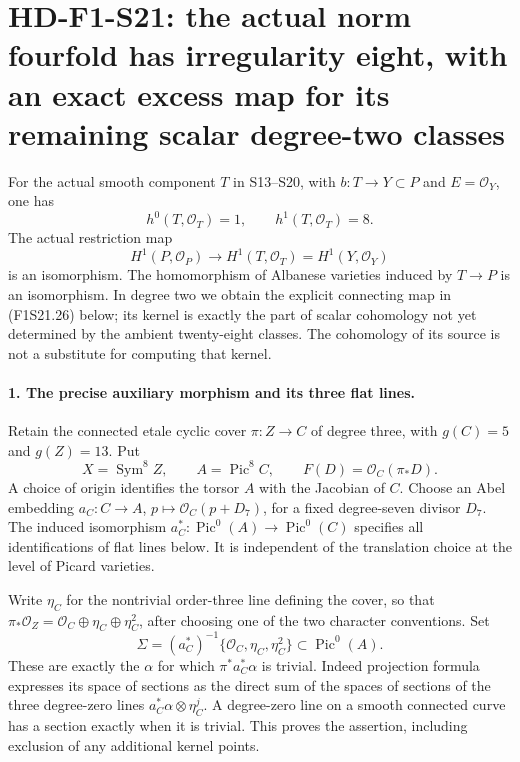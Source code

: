 \section[HD-F1-S21: irregularity eight and the excess boundary map]{HD-F1-S21: the actual norm fourfold has irregularity eight, with an exact excess map for its remaining scalar degree-two classes}
\label{sec:f1-norm-fourfold-low-cohomology}

For the actual smooth component $T$ in S13--S20, with
$b:T\to Y\subset P$ and $E=\mathcal O_Y$, one has
\[
 h^0(T,\mathcal O_T)=1,\qquad h^1(T,\mathcal O_T)=8.
 \tag{F1S21.1}
\]
The actual restriction map
\[
 H^1(P,\mathcal O_P)\longrightarrow H^1(T,\mathcal O_T)
                  =H^1(Y,\mathcal O_Y)
 \tag{F1S21.2}
\]
is an isomorphism. The homomorphism of Albanese varieties
induced by $T\to P$ is an isomorphism. In degree two we
obtain the explicit connecting map in (F1S21.26) below;
its kernel is exactly the part of scalar cohomology not
yet determined by the ambient twenty-eight classes.
The cohomology of its source is not a substitute for
computing that kernel.

\paragraph{1. The precise auxiliary morphism and its three flat lines.}
Retain the connected etale cyclic cover $\pi:Z\to C$ of
degree three, with $g(C)=5$ and $g(Z)=13$. Put
\[
 X=\operatorname{Sym}^8 Z,\qquad A=\operatorname{Pic}^8 C,
 \qquad F(D)=\mathcal O_C(\pi_*D).
 \tag{F1S21.3}
\]
A choice of origin identifies the torsor $A$ with the
Jacobian of $C$. Choose an Abel embedding
$a_C:C\to A$, $p\mapsto\mathcal O_C(p+D_7)$, for a fixed
degree-seven divisor $D_7$. The induced isomorphism
$a_C^*:\operatorname{Pic}^0(A)\to\operatorname{Pic}^0(C)$
specifies all identifications of flat lines below. It is
independent of the translation choice at the level of
Picard varieties.

Write $\eta_C$ for the nontrivial order-three line defining
the cover, so that
$\pi_*\mathcal O_Z=\mathcal O_C\oplus\eta_C\oplus\eta_C^2$,
after choosing one of the two character conventions. Set
\[
 \Sigma=(a_C^*)^{-1}\{\mathcal O_C,\eta_C,\eta_C^2\}
                  \subset\operatorname{Pic}^0(A).
 \tag{F1S21.4}
\]
These are exactly the $\alpha$ for which
$\pi^*a_C^*\alpha$ is trivial. Indeed projection formula
expresses its space of sections as the direct sum of the
spaces of sections of the three degree-zero lines
$a_C^*\alpha\otimes\eta_C^j$. A degree-zero line on a smooth
connected curve has a section exactly when it is trivial.
This proves the assertion, including exclusion of any
additional kernel points.

